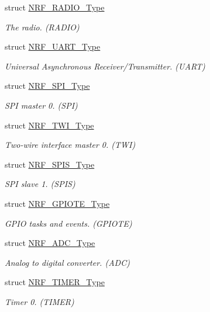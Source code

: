 \begin{DoxyCompactItemize}
struct \hyperlink{struct_n_r_f___r_a_d_i_o___type}{N\+R\+F\+\_\+\+R\+A\+D\+I\+O\+\_\+\+Type}
\begin{DoxyCompactList}\small\item\em The radio. (R\+A\+D\+I\+O) \end{DoxyCompactList}\item 
struct \hyperlink{struct_n_r_f___u_a_r_t___type}{N\+R\+F\+\_\+\+U\+A\+R\+T\+\_\+\+Type}
\begin{DoxyCompactList}\small\item\em Universal Asynchronous Receiver/\+Transmitter. (U\+A\+R\+T) \end{DoxyCompactList}\item 
struct \hyperlink{struct_n_r_f___s_p_i___type}{N\+R\+F\+\_\+\+S\+P\+I\+\_\+\+Type}
\begin{DoxyCompactList}\small\item\em S\+P\+I master 0. (S\+P\+I) \end{DoxyCompactList}\item 
struct \hyperlink{struct_n_r_f___t_w_i___type}{N\+R\+F\+\_\+\+T\+W\+I\+\_\+\+Type}
\begin{DoxyCompactList}\small\item\em Two-\/wire interface master 0. (T\+W\+I) \end{DoxyCompactList}\item 
struct \hyperlink{struct_n_r_f___s_p_i_s___type}{N\+R\+F\+\_\+\+S\+P\+I\+S\+\_\+\+Type}
\begin{DoxyCompactList}\small\item\em S\+P\+I slave 1. (S\+P\+I\+S) \end{DoxyCompactList}\item 
struct \hyperlink{struct_n_r_f___g_p_i_o_t_e___type}{N\+R\+F\+\_\+\+G\+P\+I\+O\+T\+E\+\_\+\+Type}
\begin{DoxyCompactList}\small\item\em G\+P\+I\+O tasks and events. (G\+P\+I\+O\+T\+E) \end{DoxyCompactList}\item 
struct \hyperlink{struct_n_r_f___a_d_c___type}{N\+R\+F\+\_\+\+A\+D\+C\+\_\+\+Type}
\begin{DoxyCompactList}\small\item\em Analog to digital converter. (A\+D\+C) \end{DoxyCompactList}\item 
struct \hyperlink{struct_n_r_f___t_i_m_e_r___type}{N\+R\+F\+\_\+\+T\+I\+M\+E\+R\+\_\+\+Type}
\begin{DoxyCompactList}\small\item\em Timer 0. (T\+I\+M\+E\+R) \end{DoxyCompactList}\item 

\end{DoxyCompactItemize}
